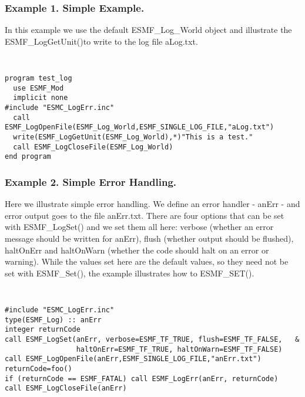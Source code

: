 %




\subsubsection{Example 1. Simple Example.}

In this example we use the default ESMF\_Log\_World object and illustrate
the ESMF\_LogGetUnit()to write to
the log file aLog.txt.

{\tt
\begin{verbatim}
program test_log
  use ESMF_Mod
  implicit none
#include "ESMC_LogErr.inc"
  call ESMF_LogOpenFile(ESMF_Log_World,ESMF_SINGLE_LOG_FILE,"aLog.txt")
  write(ESMF_LogGetUnit(ESMF_Log_World),*)"This is a test."
  call ESMF_LogCloseFile(ESMF_Log_World)
end program
\end{verbatim}
\tt}

\subsubsection{Example 2. Simple Error Handling.}

Here we illustrate simple error handling.  We define an error handler - anErr -
and error output goes to the
file anErr.txt.  There are four options that can be set with ESMF\_LogSet()
and we set them all here: verbose (whether an
error message should be written for anErr), flush (whether output should be 
flushed), haltOnErr and haltOnWarn (whether the code should halt on
an error or warning).  While the values set here are the default
values, so they need not be set with ESMF\_Set(), the example illustrates how
to ESMF\_SET().

{\tt
\begin{verbatim}
#include "ESMC_LogErr.inc" 
type(ESMF_Log) :: anErr
integer returnCode 
call ESMF_LogSet(anErr, verbose=ESMF_TF_TRUE, flush=ESMF_TF_FALSE,   &
                 haltOnErr=ESMF_TF_TRUE, haltOnWarn=ESMF_TF_FALSE)
call ESMF_LogOpenFile(anErr,ESMF_SINGLE_LOG_FILE,"anErr.txt")
returnCode=foo()
if (returnCode == ESMF_FATAL) call ESMF_LogErr(anErr, returnCode) 
call ESMF_LogCloseFile(anErr)
\end{verbatim}
\tt}

